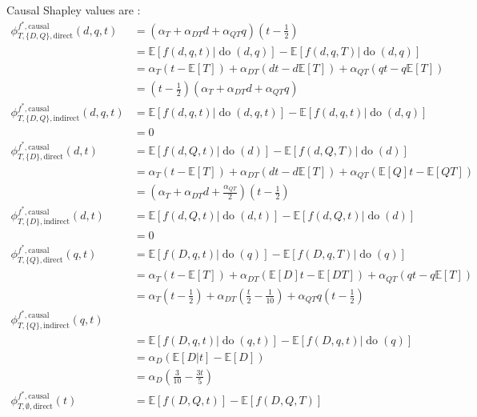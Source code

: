 \documentclass{article}
\theoremstyle{plain}
\theoremstyle{definition}
\theoremstyle{remark}
\newcommand{\Do}{\operatorname{do}}
\theoremstyle{mystyle}
\newcommand{\coalitionshapley}[4]{\phi^{#1}_{#3,#2}(#4)}
\begin{document}
Causal Shapley values are :
\begin{align*}
    \coalitionshapley{f^*,\text{causal}}{\{D,Q\},\text{direct}}{T}{d,q,t} &= (\alpha_T + \alpha_{DT} d + \alpha_{QT} q)(t - \frac{1}{2} ) \\
    &= \mathbb{E}[f(d,q,t) | \Do(d,q)] - \mathbb{E}[f(d,q,T) | \Do(d,q)] \\
    &= \alpha_T(t - \mathbb{E}[T]) + \alpha_{DT}(dt - d\mathbb{E}[T]) + \alpha_{QT}(qt - q\mathbb{E}[T]) \\
    &= (t - \frac{1}{2})(\alpha_T + \alpha_{DT}d + \alpha_{QT}q) \\
    \coalitionshapley{f^*,\text{causal}}{\{D,Q\},\text{indirect}}{T}{d,q,t} 
    &=  \mathbb{E}[f(d,q,t) | \Do(d,q,t)] - \mathbb{E}[f(d,q,t) | \Do(d,q)] \\
    &= 0 \\
    \coalitionshapley{f^*,\text{causal}}{\{D\},\text{direct}}{T}{d,t}
    &= \mathbb{E}[f(d,Q,t) | \Do(d)] - \mathbb{E}[f(d,Q,T) | \Do(d)] \\
    &= \alpha_T(t - \mathbb{E}[T]) + \alpha_{DT}(dt - d\mathbb{E}[T]) + \alpha_{QT}(\mathbb{E}[Q]t - \mathbb{E}[QT]) \\
    &= (\alpha_T + \alpha_{DT} d + \frac{\alpha_{QT}}{2} )(t - \frac{1}{2} ) \\
    \coalitionshapley{f^*,\text{causal}}{\{D\},\text{indirect}}{T}{d,t}
    &=  \mathbb{E}[f(d,Q,t) | \Do(d,t)] - \mathbb{E}[f(d,Q,t) | \Do(d)] \\
    &= 0 \\
    \coalitionshapley{f^*,\text{causal}}{\{Q\},\text{direct}}{T}{q,t}
    &= \mathbb{E}[f(D,q,t) | \Do(q)] - \mathbb{E}[f(D,q,T) | \Do(q)] \\
    &= \alpha_T(t - \mathbb{E}[T]) + \alpha_{DT}(\mathbb{E}[D]t - \mathbb{E}[DT]) + \alpha_{QT}(qt - q\mathbb{E}[T]) \\
    &=  \alpha_T(t - \frac{1}{2}) +  \alpha_{DT}(\frac{t}{2} - \frac{1}{10}) + \alpha_{QT}q (t - \frac{1}{2}) \\
    \coalitionshapley{f^*,\text{causal}}{\{Q\},\text{indirect}}{T}{q,t}  \\
    &=  \mathbb{E}[f(D,q,t) | \Do(q,t)] - \mathbb{E}[f(D,q,t) | \Do(q)] \\
    &= \alpha_D (\mathbb{E}[D|t] - \mathbb{E}[D]) \\
    &= \alpha_D (\frac{3}{10} - \frac{3t}{5}) \\
    \coalitionshapley{f^*,\text{causal}}{\emptyset,\text{direct}}{T}{t}
    &= \mathbb{E}[f(D,Q,t)] - \mathbb{E}[f(D,Q,T)] \\

\end{align*}
\end{document}
